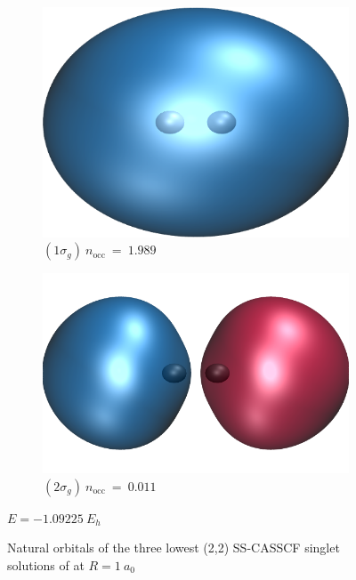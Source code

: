 \documentclass[aps,prb,reprint,showkeys,superscriptaddress]{revtex4-1}
\begin{document}
\begin{figure}
  \begin{subfigure}[l]{0.45\linewidth}
    \includegraphics[width=0.75\linewidth]{Figures/h2_HF_mo1.cube.png}
    \caption*{\centering $(1\sigma_g)~n_\text{occ}~=~1.989$}
  \end{subfigure}
  \begin{subfigure}[r]{0.5\linewidth}
    \includegraphics[width=0.75\linewidth]{Figures/h2_HF_mo2.cube.png}
    \caption*{\centering $(2\sigma_g)~n_\text{occ}~=~0.011$}
  \end{subfigure}
  $E=-1.09225~E_h$
  
  \caption{Natural orbitals of the three lowest (2,2) SS-CASSCF singlet solutions of  at $R=1~a_0$ \label{fig:fig_3}}
\end{figure}
\end{document}
